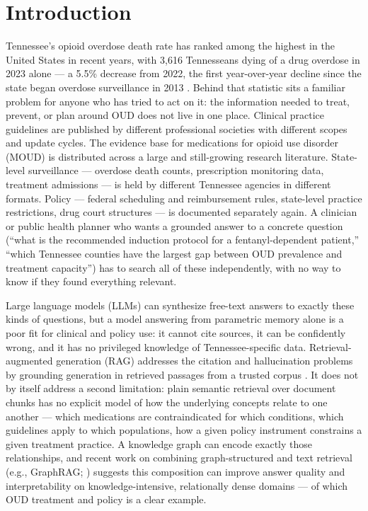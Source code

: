 \documentclass[11pt]{article}
\begin{document}
\begin{abstract}
answer-score variation that remained is indistinguishable from ordinary generation stochasticity, not a demographic effect.
\end{abstract}

\section{Introduction}

Tennessee's opioid overdose death rate has ranked among the highest in the United States in recent years, with 3{,}616 Tennesseans dying of a drug overdose in 2023 alone --- a 5.5\% decrease from 2022, the first year-over-year decline since the state began overdose surveillance in 2013 \citep{tdh2025}. Behind that statistic sits a familiar problem for anyone who has tried to act on it: the information needed to treat, prevent, or plan around OUD does not live in one place. Clinical practice guidelines are published by different professional societies with different scopes and update cycles. The evidence base for medications for opioid use disorder (MOUD) is distributed across a large and still-growing research literature. State-level surveillance --- overdose death counts, prescription monitoring data, treatment admissions --- is held by different Tennessee agencies in different formats. Policy --- federal scheduling and reimbursement rules, state-level practice restrictions, drug court structures --- is documented separately again. A clinician or public health planner who wants a grounded answer to a concrete question (``what is the recommended induction protocol for a fentanyl-dependent patient,'' ``which Tennessee counties have the largest gap between OUD prevalence and treatment capacity'') has to search all of these independently, with no way to know if they found everything relevant.

Large language models (LLMs) can synthesize free-text answers to exactly these kinds of questions, but a model answering from parametric memory alone is a poor fit for clinical and policy use: it cannot cite sources, it can be confidently wrong, and it has no privileged knowledge of Tennessee-specific data. Retrieval-augmented generation (RAG) addresses the citation and hallucination problems by grounding generation in retrieved passages from a trusted corpus \cite{lewis2020rag}. It does not by itself address a second limitation: plain semantic retrieval over document chunks has no explicit model of how the underlying concepts relate to one another --- which medications are contraindicated for which conditions, which guidelines apply to which populations, how a given policy instrument constrains a given treatment practice. A knowledge graph can encode exactly those relationships, and recent work on combining graph-structured and text retrieval (e.g., GraphRAG; \citealp{edge2024graphrag}) suggests this composition can improve answer quality and interpretability on knowledge-intensive, relationally dense domains --- of which OUD treatment and policy is a clear example.
\end{document}
